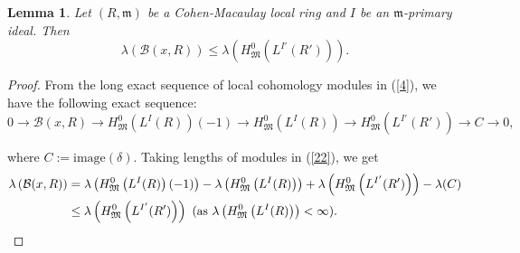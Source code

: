 \documentclass[10pt,a4paper]{amsart}
\newtheorem{lemma}{Lemma}
\newcommand{\M}{\mathfrak{M}}
\newcommand{\m}{\mathfrak{m} }
\begin{document}
\begin{lemma} \label{comparing}
Let $(R, \m)$ be a Cohen-Macaulay local ring and $I$ be an $\m$-primary ideal. 
 Then 
 \begin{equation*}
     \lambda(\mathcal{B}(x,R))\leq \lambda\left(H^{0}_{\M}\left(L^{I'}(R')\right)\right).
 \end{equation*}
\end{lemma}

\begin{proof}
    From the long exact sequence of local cohomology modules in (\ref{4}), we have the following exact sequence:
    \begin{equation} \label{22}
       0 \longrightarrow \mathcal{B}(x,R)   \longrightarrow H^{0}_{\M}\left(L^{I}(R)\right)(-1) 
        \longrightarrow H^{0}_{\M}\left(L^{I}(R)\right) 
        \longrightarrow H^{0}_{\M}\left(L^{I'}(R')\right) 
        \longrightarrow C 
        \longrightarrow 0,
    \end{equation}

    where $C:=\textrm{image} (\delta)$. 
Taking  lengths of modules in (\ref{22}), we get
\begin{align*}
       \lambda\left(\mathcal{B}(x,R)\right)
 & = \lambda\left(H^{0}_{\M}\left(L^{I}(R)\right)(-1)\right)
  -\lambda\left(H^{0}_{\M}\left(L^{I}(R)\right)\right)
  +\lambda\left(H^{0}_{\M}\left(L^{I'}(R')\right)\right)
  - \lambda(C)\\
 & \leq \lambda\left(H^{0}_{\M}\left(L^{I'}(R')\right)\right)  \text{ (as  $\lambda\left(H^{0}_{\M}\left(L^{I}(R)\right)\right) < \infty)$}. \quad \quad\qedhere
\end{align*} 
\end{proof}
\end{document}
